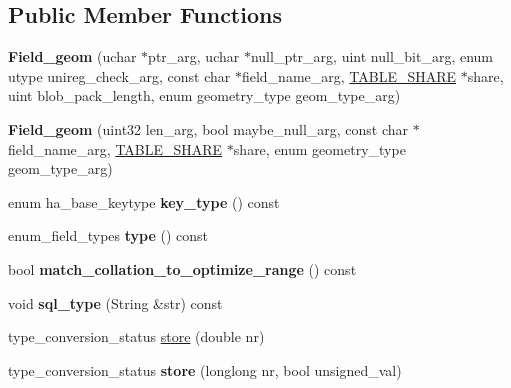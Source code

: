 \subsection*{Public Member Functions}
\begin{DoxyCompactItemize}
\item 
\mbox{\label{classField__geom_afd43c56a91f8c1e7ebde196a662c5ffa}} 
{\bfseries Field\+\_\+geom} (uchar $\ast$ptr\+\_\+arg, uchar $\ast$null\+\_\+ptr\+\_\+arg, uint null\+\_\+bit\+\_\+arg, enum utype unireg\+\_\+check\+\_\+arg, const char $\ast$field\+\_\+name\+\_\+arg, \mbox{\hyperlink{structTABLE__SHARE}{T\+A\+B\+L\+E\+\_\+\+S\+H\+A\+RE}} $\ast$share, uint blob\+\_\+pack\+\_\+length, enum geometry\+\_\+type geom\+\_\+type\+\_\+arg)
\item 
\mbox{\label{classField__geom_aad9a43475eb4ad0b4c0317ab840709e4}} 
{\bfseries Field\+\_\+geom} (uint32 len\+\_\+arg, bool maybe\+\_\+null\+\_\+arg, const char $\ast$field\+\_\+name\+\_\+arg, \mbox{\hyperlink{structTABLE__SHARE}{T\+A\+B\+L\+E\+\_\+\+S\+H\+A\+RE}} $\ast$share, enum geometry\+\_\+type geom\+\_\+type\+\_\+arg)
\item 
\mbox{\label{classField__geom_a53350fd147407f8951847ddac9ba6530}} 
enum ha\+\_\+base\+\_\+keytype {\bfseries key\+\_\+type} () const
\item 
\mbox{\label{classField__geom_a990773b058879240535ef7dd117988cd}} 
enum\+\_\+field\+\_\+types {\bfseries type} () const
\item 
\mbox{\label{classField__geom_a2fb62636c68e2bdc984fa7a0c1e920b9}} 
bool {\bfseries match\+\_\+collation\+\_\+to\+\_\+optimize\+\_\+range} () const
\item 
\mbox{\label{classField__geom_afe31adfb04c8049bd77cbc6f6e64aefc}} 
void {\bfseries sql\+\_\+type} (String \&str) const
\item 
type\+\_\+conversion\+\_\+status \mbox{\hyperlink{classField__geom_aa150c79e0569c74ed2a004ddab0dc6f1}{store}} (double nr)
\item 
\mbox{\label{classField__geom_ae321babed12d712a9204dda172db3b1d}} 
type\+\_\+conversion\+\_\+status {\bfseries store} (longlong nr, bool unsigned\+\_\+val)

\end{DoxyCompactItemize}
